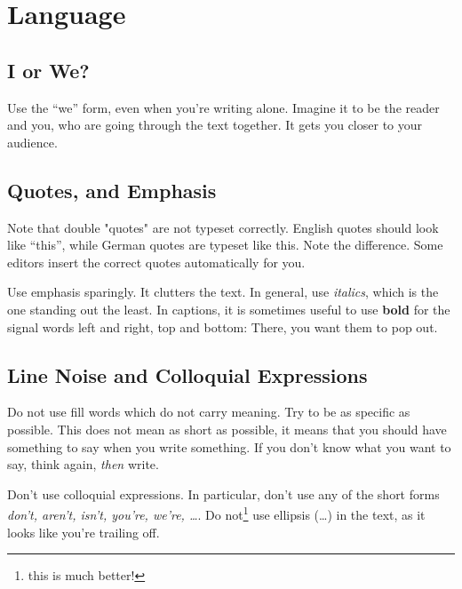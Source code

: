 \documentclass[12pt, %
a4paper, %
twoside, %
openright, %
abstract=on, %
DIV=11,      %
BCOR=8mm]{scrbook} %
\begin{document}
    \tableofcontents
    \listoffigures
    \listofalgorithms

    \newpage
    \mainmatter
    

    \chapter{Language}

    \section{I or We?}

    Use the ``we'' form, even when  you're writing alone.  Imagine it to be
    the reader and  you, who are going through the  text together.  It gets
    you closer to your audience.

    \section{Quotes, and Emphasis}
    Note that double  "quotes" are not typeset  correctly.  English quotes 
    should look like ``this'', while  German quotes are typeset like \glqq 
    this\grqq.   Note the  difference.   Some editors  insert the  correct 
    quotes automatically for you.                                          

    Use  emphasis  sparingly.  It  clutters  the  text.  In  general,  use 
    \emph{italics}, which is the one standing out the least.  In captions, 
    it is sometimes useful to use  \textbf{bold} for the signal words left 
    and right, top and bottom: There, you want them to pop out.

    \section{Line Noise and Colloquial Expressions}

    Do  not use  fill words  which do  not carry  meaning.  Try  to be  as 
    specific as  possible.  This does  not mean  as short as  possible, it 
    means that you should have something to say when you write something.
    If you don't know what you want to say, think again, \emph{then} write.

    Don't use colloquial expressions.  In particular, don't use any of the 
    short forms  \emph{don't, aren't,  isn't, you're, we're,  \ldots}.  Do 
    not\footnote{this is much better!} use  ellipsis (\ldots) in the text, 
    as it looks like you're trailing off.                                  
\end{document}
